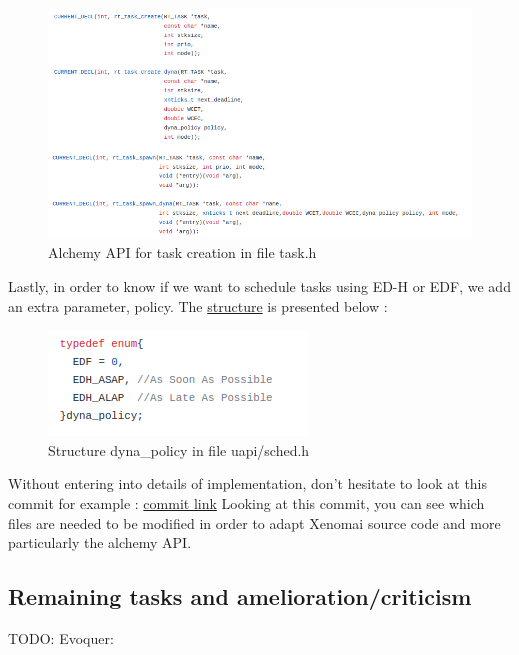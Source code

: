 \documentclass[12pt,hidelinks]{article}
\begin{document}
{\begin{itemize}
	     \begin{figure}[!h]
        \centering
    	\includegraphics[scale=0.6]{alchemyAPI.png}
    	\caption{Alchemy API for task creation in file task.h}
    	\end{figure} \newline
	    
	    Lastly, in order to know if we want to schedule tasks using ED-H or EDF, we add an extra parameter, policy. The \href{https://github.com/skyultime/Xenomai-EDH/blob/final_version/include/cobalt/uapi/sched.h}{structure} is presented below :
	    
	     \begin{figure}[!h]
        \centering
    	\includegraphics[scale=1]{dyna_policy.png}
    	\caption{Structure dyna\_policy in file uapi/sched.h}
    	\end{figure} \newline
	    
	\end{itemize}
	
	Without entering into details of implementation, don't hesitate to look at this commit for example : \href{https://github.com/skyultime/Xenomai-EDH/commit/f339c141faf314a96725899d3941c65e162457d1}{commit link}
	Looking at this commit, you can see which files are needed to be modified in order to adapt Xenomai source code and more particularly the alchemy API.  
	
	\newpage \subsection{Remaining tasks and amelioration/criticism}
	TODO: Evoquer:
	\begin{itemize}
	    

\end{itemize}}
\end{document}
